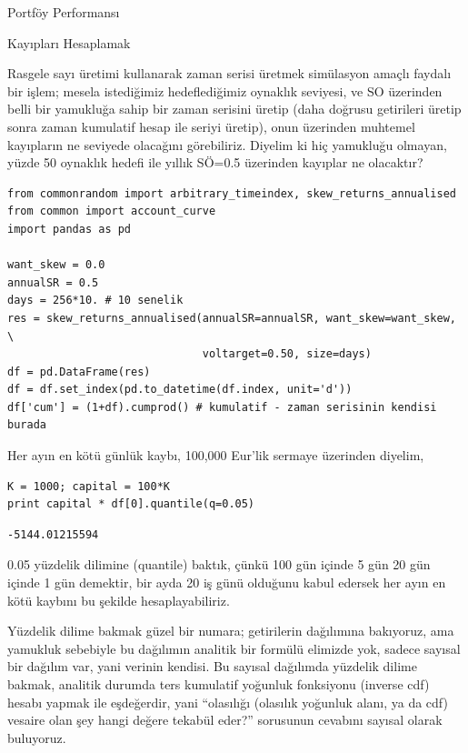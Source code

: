 \documentclass[12pt,fleqn]{article}\usepackage{../../common}
\begin{document}
Portföy Performansı

Kayıpları Hesaplamak

Rasgele sayı üretimi kullanarak zaman serisi üretmek simülasyon amaçlı faydalı
bir işlem; mesela istediğimiz hedeflediğimiz oynaklık seviyesi, ve SO üzerinden
belli bir yamukluğa sahip bir zaman serisini üretip (daha doğrusu getirileri
üretip sonra zaman kumulatif hesap ile seriyi üretip), onun üzerinden muhtemel
kayıpların ne seviyede olacağını görebiliriz. Diyelim ki hiç yamukluğu olmayan,
yüzde 50 oynaklık hedefi ile yıllık SÖ=0.5 üzerinden kayıplar ne olacaktır?

\begin{verbatim}
from commonrandom import arbitrary_timeindex, skew_returns_annualised
from common import account_curve
import pandas as pd

want_skew = 0.0
annualSR = 0.5
days = 256*10. # 10 senelik
res = skew_returns_annualised(annualSR=annualSR, want_skew=want_skew, \
                              voltarget=0.50, size=days) 
df = pd.DataFrame(res)
df = df.set_index(pd.to_datetime(df.index, unit='d'))
df['cum'] = (1+df).cumprod() # kumulatif - zaman serisinin kendisi burada
\end{verbatim}

Her ayın en kötü günlük kaybı, 100,000 Eur'lik sermaye üzerinden diyelim,

\begin{verbatim}
K = 1000; capital = 100*K
print capital * df[0].quantile(q=0.05)
\end{verbatim}

\begin{verbatim}
-5144.01215594
\end{verbatim}

0.05 yüzdelik dilimine (quantile) baktık, çünkü 100 gün içinde 5 gün 20 gün
içinde 1 gün demektir, bir ayda 20 iş günü olduğunu kabul edersek her ayın en
kötü kaybını bu şekilde hesaplayabiliriz.

Yüzdelik dilime bakmak güzel bir numara; getirilerin dağılımına bakıyoruz, ama
yamukluk sebebiyle bu dağılımın analitik bir formülü elimizde yok, sadece
sayısal bir dağılım var, yani verinin kendisi. Bu sayısal dağılımda yüzdelik
dilime bakmak, analitik durumda ters kumulatif yoğunluk fonksiyonu (inverse cdf)
hesabı yapmak ile eşdeğerdir, yani ``olasılığı (olasılık yoğunluk alanı, ya da
cdf) vesaire olan şey hangi değere tekabül eder?'' sorusunun cevabını sayısal
olarak buluyoruz.
\end{document}
